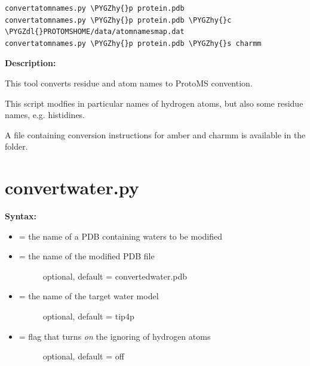\documentclass[letterpaper,10pt,english]{sphinxmanual}
\def\PYGZdl{\char`\$}
\def\PYGZhy{\char`\-}
\begin{document}
\begin{Verbatim}[frame=single,commandchars=\\\{\}]
convertatomnames.py \PYGZhy{}p protein.pdb
convertatomnames.py \PYGZhy{}p protein.pdb \PYGZhy{}c \PYGZdl{}PROTOMSHOME/data/atomnamesmap.dat
convertatomnames.py \PYGZhy{}p protein.pdb \PYGZhy{}s charmm
\end{Verbatim}

\textbf{Description:}

This tool converts residue and atom names to ProtoMS convention.

This script modfies in particular names of hydrogen atoms, but also some residue names, e.g. histidines.

A file containing conversion instructions for amber and charmm is available in the  folder.


\section{convertwater.py}
\label{tools:convertwater-py}
\textbf{Syntax:}

\begin{itemize}
\item {} 
 = the name of a PDB containing waters to be modified

\item {} \begin{description}
\item[{ = the name of the modified PDB file}] \leavevmode
optional, default = convertedwater.pdb

\end{description}

\item {} \begin{description}
\item[{ = the name of the target water model}] \leavevmode
optional, default = tip4p

\end{description}

\item {} \begin{description}
\item[{ = flag that turns \emph{on} the ignoring of hydrogen atoms}] \leavevmode
optional, default = off

\end{description}

\end{itemize}
\end{document}
